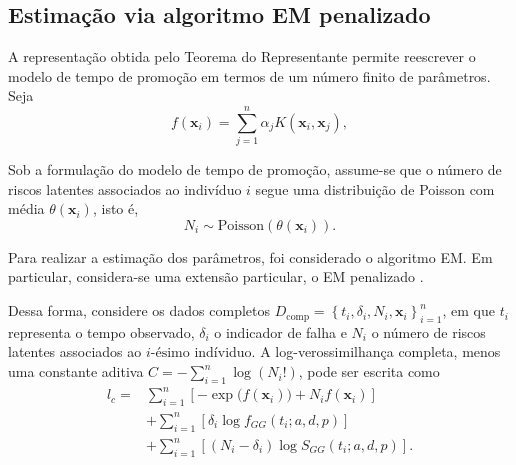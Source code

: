 
\subsection{Estimação via algoritmo EM penalizado}

A representação obtida pelo Teorema do Representante permite reescrever o modelo de tempo de promoção em
termos de um número finito de parâmetros. Seja
\begin{equation}
f(\mathbf{x}_i) = \sum_{j=1}^{n} \alpha_j K(\mathbf{x}_i,\mathbf{x}_j),
\end{equation}

Sob a formulação do modelo de tempo de promoção, assume-se que o número de riscos latentes associados ao
indivíduo $i$ segue uma distribuição de Poisson com média $\theta(\mathbf{x}_i)$, isto é,
\begin{equation}
N_i
\sim
\text{Poisson}
\left(
\theta(\mathbf{x}_i)
\right).
\end{equation}

Para realizar a estimação dos parâmetros, foi considerado o algoritmo EM. Em particular, considera-se uma extensão
particular, o EM penalizado \cite{mclachlan2008algorithm}.


Dessa forma, considere os dados completos $D_{\text{comp}} = \left\{t_i, \delta_i, N_i, \mathbf{x}_i\right\}^n_{i=1}$,
em que $t_i$ representa o tempo observado, $\delta_i$ o indicador de falha e $N_i$ o número de riscos latentes
associados ao $i\text{-ésimo}$ indíviduo. A log-verossimilhança completa, menos uma constante aditiva
$C = -\sum_{i=1}^n \log\left(N_i!\right)$, pode ser escrita como
\begin{equation}
\begin{aligned}
l_c
=
&
\sum_{i=1}^{n}
\left[
-\exp\!\bigl(f(\mathbf{x}_i)\bigr)
+
N_i f(\mathbf{x}_i)
\right]
\\
&
+
\sum_{i=1}^{n}
\left[
\delta_i
\log f_{GG}(t_i;a,d,p)
\right]
\\
&
+
\sum_{i=1}^{n}
\left[
(N_i-\delta_i)
\log S_{GG}(t_i;a,d,p)
\right].
\end{aligned}
\end{equation}

